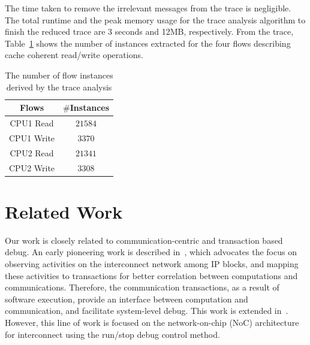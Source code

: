 \documentclass[conference]{IEEEtran}
\begin{document}
The time taken to remove the irrelevant messages from the trace is negligible.  The total runtime and the peak memory usage for the trace analysis algorithm to finish the reduced trace are 3 seconds and 12MB, respectively.  From the trace, Table~\ref{table-case-2} shows the number of instances extracted for the four flows describing cache coherent read/write operations. 
\begin{table}[td]
\caption{The number of flow instances derived by the trace analysis}
\begin{center}
\begin{tabular}{|c|c|}
\hline
Flows & $\#$Instances \\
\hline
\hline
CPU1 Read		&  $21584$\\
CPU1 Write	&  $3370$\\
CPU2 Read		&  $21341$\\
CPU2 Write	&  $3308$\\
\hline
\end{tabular}
\end{center}
\label{table-case-2}
\end{table}%



\section{Related Work}

Our work is closely related to communication-centric and transaction based debug.  An early pioneering work is described in~\cite{Goossens2007NOCS}, which advocates the focus on observing activities on the interconnect network among IP blocks, and mapping these activities to transactions for better correlation between computations and communications.  Therefore, the communication transactions, as a result of software execution, provide an interface between computation and communication, and facilitate  system-level debug.  This work is extended in~\cite{Vermeulen2009VLSI-DAT,Goossens2009DATE}.  However, this line of work is focused on the network-on-chip (NoC) architecture for interconnect using the run/stop debug control method.  
\end{document}

